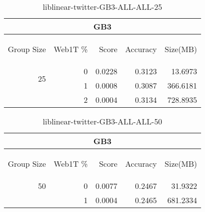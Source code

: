 \begin{center}
\begin{table}[htbp] 
 \begin{center}
\begin{tabular}{ | r | r | r | r | r |}
\hline
\multicolumn{5}{|c|}{GB3}\\
\hline
\begin{sideways}Group Size\end{sideways} & \begin{sideways}Web1T \%\end{sideways} & \begin{sideways}Score\end{sideways} & \begin{sideways}Accuracy\end{sideways} & \begin{sideways}Size(MB)\end{sideways}\\
\hline
\multirow{2}{*}{25}
 & 0 & 0.0228 & 0.3123 & 13.6973\\ \cline{2-5}
 & 1 & 0.0008 & 0.3087 & 366.6181\\ \cline{2-5}
 & 2 & 0.0004 & 0.3134 & 728.8935\\ \cline{2-5}
\hline
\end{tabular}
\caption{liblinear-twitter-GB3-ALL-ALL-25}
\label{table:liblinear-twitter-GB3-ALL-ALL-25}
\end{center}
 \end{table}
\end{center}

\begin{center}
\begin{table}[htbp] 
 \begin{center}
\begin{tabular}{ | r | r | r | r | r |}
\hline
\multicolumn{5}{|c|}{GB3}\\
\hline
\begin{sideways}Group Size\end{sideways} & \begin{sideways}Web1T \%\end{sideways} & \begin{sideways}Score\end{sideways} & \begin{sideways}Accuracy\end{sideways} & \begin{sideways}Size(MB)\end{sideways}\\
\hline
\multirow{1}{*}{50}
 & 0 & 0.0077 & 0.2467 & 31.9322\\ \cline{2-5}
 & 1 & 0.0004 & 0.2465 & 681.2334\\ \cline{2-5}
\hline
\end{tabular}
\caption{liblinear-twitter-GB3-ALL-ALL-50}
\label{table:liblinear-twitter-GB3-ALL-ALL-50}
\end{center}
 \end{table}
\end{center}

